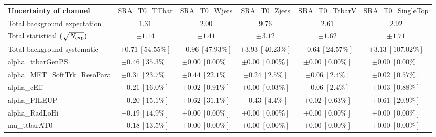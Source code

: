 
\begin{sidewaystable}
\begin{center}
\setlength{\tabcolsep}{0.0pc}
\begin{tabular*}{\textwidth}{@{\extracolsep{\fill}}lccccc}
\noalign{\smallskip}\hline\noalign{\smallskip}
{\bf Uncertainty of channel}                                    & SRA\_T0\_TTbar            & SRA\_T0\_Wjets            & SRA\_T0\_Zjets            & SRA\_T0\_TtbarV            & SRA\_T0\_SingleTop            \\
\noalign{\smallskip}\hline\noalign{\smallskip}
Total background expectation             &  $1.31$        &  $2.00$        &  $9.76$        &  $2.61$        &  $2.92$       \\
\noalign{\smallskip}\hline\noalign{\smallskip}
Total statistical $(\sqrt{N_{\rm exp}})$              & $\pm 1.14$        & $\pm 1.41$        & $\pm 3.12$        & $\pm 1.62$        & $\pm 1.71$       \\
Total background systematic               & $\pm 0.71\ [54.55\%] $        & $\pm 0.96\ [47.93\%] $        & $\pm 3.93\ [40.23\%] $        & $\pm 0.64\ [24.57\%] $        & $\pm 3.13\ [107.02\%] $             \\
\noalign{\smallskip}\hline\noalign{\smallskip}
\noalign{\smallskip}\hline\noalign{\smallskip}
alpha\_ttbarGenPS         & $\pm 0.46\ [35.3\%] $          & $\pm 0.00\ [0.00\%] $          & $\pm 0.00\ [0.00\%] $          & $\pm 0.00\ [0.00\%] $          & $\pm 0.00\ [0.00\%] $       \\
alpha\_MET\_SoftTrk\_ResoPara         & $\pm 0.31\ [23.7\%] $          & $\pm 0.44\ [22.1\%] $          & $\pm 0.24\ [2.5\%] $          & $\pm 0.06\ [2.4\%] $          & $\pm 0.02\ [0.57\%] $       \\
alpha\_cEff         & $\pm 0.21\ [16.0\%] $          & $\pm 0.02\ [0.91\%] $          & $\pm 0.00\ [0.03\%] $          & $\pm 0.06\ [2.4\%] $          & $\pm 0.03\ [0.88\%] $       \\
alpha\_PILEUP         & $\pm 0.20\ [15.1\%] $          & $\pm 0.62\ [31.1\%] $          & $\pm 0.43\ [4.4\%] $          & $\pm 0.02\ [0.63\%] $          & $\pm 0.61\ [20.9\%] $       \\
alpha\_RadLoHi         & $\pm 0.19\ [14.9\%] $          & $\pm 0.00\ [0.00\%] $          & $\pm 0.00\ [0.00\%] $          & $\pm 0.00\ [0.00\%] $          & $\pm 0.00\ [0.00\%] $       \\
mu\_ttbarAT0         & $\pm 0.18\ [13.5\%] $          & $\pm 0.00\ [0.00\%] $          & $\pm 0.00\ [0.00\%] $          & $\pm 0.00\ [0.00\%] $          & $\pm 0.00\ [0.00\%] $       \\

\end{tabular*}
\end{center}
\end{sidewaystable}
